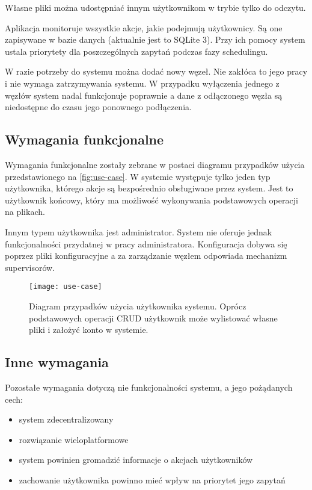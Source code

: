 Własne pliki można udostępniać innym użytkownikom w trybie tylko do odczytu.

Aplikacja monitoruje wszystkie akcje, jakie podejmują użytkownicy. Są one zapisywane w bazie danych (aktualnie jest to SQLite 3). Przy ich pomocy system ustala priorytety dla poszczególnych zapytań podczas fazy schedulingu.

W razie potrzeby do systemu można dodać nowy węzeł. Nie zakłóca to jego pracy i nie wymaga zatrzymywania systemu. W przypadku wyłączenia jednego z węzłów system nadal funkcjonuje poprawnie a dane z odłączonego węzła są niedostępne do czasu jego ponownego podłączenia.

\subsection{Wymagania funkcjonalne}
Wymagania funkcjonalne zostały zebrane w postaci diagramu przypadków użycia przedstawionego na \autoref{fig:use-case}. W systemie występuje tylko jeden typ użytkownika, którego akcje są bezpośrednio obsługiwane przez system. Jest to użytkownik końcowy, który ma możliwość wykonywania podstawowych operacji na plikach.

Innym typem użytkownika jest administrator. System nie oferuje jednak funkcjonalności przydatnej w pracy administratora. Konfiguracja dobywa się poprzez pliki konfiguracyjne a za zarządzanie węzłem odpowiada mechanizm supervisorów.

\begin{figure}[!htbp]
	\centering
	\texttt{[image: use-case]}
	\caption[Diagram przypadków użycia użytkownika systemu.]{Diagram przypadków użycia użytkownika systemu. Oprócz podstawowych operacji CRUD użytkownik może wylistować własne pliki i założyć konto w systemie.}
	\label{fig:use-case}
\end{figure}

\subsection{Inne wymagania}
Pozostałe wymagania dotyczą nie funkcjonalności systemu, a jego pożądanych cech:
\begin{itemize}
	\item system zdecentralizowany
	\item rozwiązanie wieloplatformowe
	\item system powinien gromadzić informacje o akcjach użytkowników
	\item zachowanie użytkownika powinno mieć wpływ na priorytet jego zapytań
\end{itemize}
